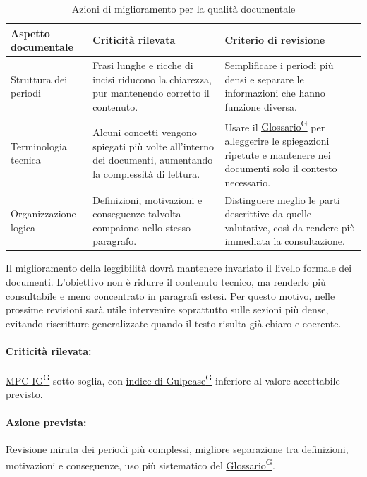 \documentclass[a4paper,12pt]{article}
\providecommand{\glslink}[2]{\href{https://alittlebyte-19.github.io/Documentazione/glossario.html\#gls-#1}{\underline{#2}\textsuperscript{\scriptsize G}}}
\begin{document}
\begin{table}[H]
    \centering
    \renewcommand{\arraystretch}{1.25}
    \begin{tabularx}{\textwidth}{|p{3.2cm}|X|X|}
        \hline
        \rowcolor{gray!35}
        \textbf{Aspetto documentale} & \textbf{Criticità rilevata} & \textbf{Criterio di revisione} \\
        \hline
        Struttura dei periodi & Frasi lunghe e ricche di incisi riducono la chiarezza, pur mantenendo corretto il contenuto. & Semplificare i periodi più densi e separare le informazioni che hanno funzione diversa. \\
        \hline
        Terminologia tecnica & Alcuni concetti vengono spiegati più volte all'interno dei documenti, aumentando la complessità di lettura. & Usare il \glslink{glossario}{Glossario} per alleggerire le spiegazioni ripetute e mantenere nei documenti solo il contesto necessario. \\
        \hline
        Organizzazione logica & Definizioni, motivazioni e conseguenze talvolta compaiono nello stesso paragrafo. & Distinguere meglio le parti descrittive da quelle valutative, così da rendere più immediata la consultazione. \\
        \hline
    \end{tabularx}
    \caption{Azioni di miglioramento per la qualità documentale}
\end{table}

Il miglioramento della leggibilità dovrà mantenere invariato il livello formale dei documenti. L'obiettivo non è ridurre il contenuto tecnico, ma renderlo più consultabile e meno concentrato in paragrafi estesi. Per questo motivo, nelle prossime revisioni sarà utile intervenire soprattutto sulle sezioni più dense, evitando riscritture generalizzate quando il testo risulta già chiaro e coerente.

\paragraph*{Criticità rilevata:} \glslink{indice-di-gulpease-mpc-ig}{MPC-IG} sotto soglia, con \glslink{indice-di-gulpease-mpc-ig}{indice di Gulpease} inferiore al valore accettabile previsto.

\paragraph*{Azione prevista:} Revisione mirata dei periodi più complessi, migliore separazione tra definizioni, motivazioni e conseguenze, uso più sistematico del \glslink{glossario}{Glossario}.
\end{document}
